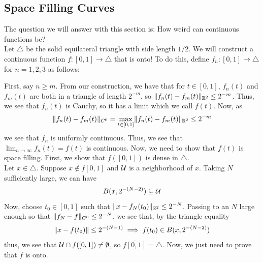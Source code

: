 \subsection*{Space Filling Curves}
\sectionspace

The question we will answer with this section is: How weird can continuous functions be?\\

Let $\triangle$ be the solid equilateral triangle with side length $1/2$. We will construct a continuous function $f : [0, 1] \to \triangle$ that is onto! To do this, define $f_n : [0, 1] \to \triangle$ for $n = 1, 2, 3$ as follows:


First, say $n \geq m$. From our construction, we have that for $t \in [0, 1]$, $f_{n}(t)$ and $f_{m}(t)$ are both in a triangle of length $2^{-m}$, so $\norm{f_{n}(t) - f_{m}(t)}_{\R^2} \leq 2^{-m}$. Thus, we see that $f_{n}(t)$ is Cauchy, so it has a limit which we call $f(t)$. Now, as
\[ \norm{f_{n}(t) - f_{m}(t)}_{C^{0}} = \max_{t \in [0, 1]} \norm{f_{n}(t) - f_{m}(t)}_{\R^2} \leq 2^{-m} \]
we see that $f_{n}$ is uniformly continuous. Thus, we see that $\lim_{n \to \infty} f_{n}(t) = f(t)$ is continuous. Now, we need to show that $f(t)$ is space filling. First, we show that $f([0, 1])$ is dense in $\triangle$.\\

Let $x \in \triangle$. Suppose $x \notin f[0, 1]$ and $\cal{U}$ is a neighborhood of $x$. Taking $N$ sufficiently large, we can have
\[ B(x, 2^{-(N - 2)}) \subseteq \cal{U} \]
Now, choose $t_0 \in [0, 1]$ such that $\norm{x - f_{N}(t_0)}_{\R^2} \leq 2^{-N}$. Passing to an $N$ large enough so that $\norm{f_{N} - f}_{C^0} \leq 2^{-N}$, we see that, by the triangle equality
\[ \norm{x - f(t_0)} \leq 2^{-(N - 1)} \implies f(t_0) \in B(x, 2^{-(N - 2)}) \]
thus, we see that $\cal{U} \cap f([0, 1]) \ne \emptyset$, so $\overline{f[0, 1]} = \triangle$. Now, we just need to prove that $f$ is onto. 